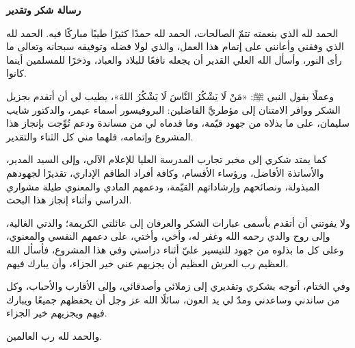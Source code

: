 \documentclass[12pt,a4paper]{article}
\begin{document}
\vspace*{0.65cm}

\begin{center}
{\color{darkcharcoal}\fontsize{16}{19}\selectfont\bfseries
\textarabic{رسالة شكر وتقدير}}
\end{center}

\vspace{1.2em}

\begin{Arabic}
\fontsize{13}{24}\selectfont

الحمد لله الذي بنعمته تتمّ الصالحات، الحمد لله حمدًا كثيرًا طيبًا مباركًا فيه. الحمد لله الذي وفقني وأعانني على إتمام هذا العمل، والذي لولا فضله وتوفيقه سبحانه وتعالى ما رأى النور، وأسأل الله العلي القدير أن يجعله نافعًا للبلاد والعباد، وذخرًا للمسلمين أينما كانوا.

\medskip

وعملًا بقول النبي {\salatfont ﷺ}: «مَنْ لَا يَشْكُرُ النَّاسَ لَا يَشْكُرُ اللهَ»، يطيب لي أن أتقدم بجزيل الشكر ووافر الامتنان إلى مؤطريَّ الفاضلين: البروفيسور أسماء عيمر، والدكتور شايب سليمان، على ما بذلاه من جهود قيّمة، وما قدماه لي من مساندة ودعم تُوِّجت بإنجاز هذا المشروع وإتمامه، فلهما مني كل الثناء والتقدير.

\medskip

كما يمتد شكري إلى مخبر تجارب المدرسة العليا للإعلام الآلي، وإلى السيد المدير، والأساتذة الأفاضل، ورؤساء الأقسام، وكافة أفراد الطاقم الإداري، تقديرًا لجهودهم المبذولة، ونصائحهم وإرشاداتهم القيّمة، ودعمهم المادي والمعنوي طيلة مشواري الدراسي وأثناء إنجاز هذا البحث.

\medskip

ولا يفوتني أن أتقدم بأسمى عبارات الشكر والعرفان إلى عائلتي الكريمة؛ والدتي الغالية، وإلى روح والدي رحمه الله وغفر له، وأخي، وأختي، على دعمهم النفسي والمعنوي، وعلى كل ما بذلوه من جهود للتيسير عليّ أثناء دراستي وفي هذا المشروع، فأسأل الله العظيم رب العرش العظيم أن يجزيهم عني خير الجزاء، وأن يبارك فيهم.

\medskip

وفي الختام، أتوجه بشكري وتقديري إلى زملائي وأصدقائي، وإلى الأقارب والأحباب، وكل من ساندني وساعدني ومدّ لي يد العون، سائلًا الله عز وجل أن يحفظهم جميعًا ويبارك فيهم ويجزيهم خير الجزاء.

\medskip

والحمد لله رب العالمين.

\end{Arabic}
\end{document}
